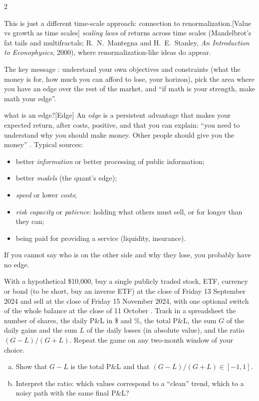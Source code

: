 \begin{paracol}{2}
\begin{answer}{This is just a different time-scale approach: connection to renormalization.}[Value vs growth as time scales]
\emph{scaling laws} of returns across time scales (Mandelbrot's fat tails and multifractals;
R.~N.~Mantegna and H.~E.~Stanley, \emph{An Introduction to Econophysics}, 2000), where
renormalization-like ideas do appear.
\end{answer}
The key message : understand your own objectives and constraints (what the
money is for, how much you can afford to lose, your horizon), pick the area where you have an edge
over the rest of the market, and ``if math is your strength, make math your edge''. \begin{answer}{what is an edge?}[Edge]
An \emph{edge} is a persistent advantage that makes your expected return, after costs, positive,
and that you can explain: ``you need to understand why you should make money. Other people
should give you the money'' . Typical sources:
\begin{itemize}
  \item better \emph{information} or better processing of public information;
  \item better \emph{models} (the quant's edge);
  \item \emph{speed} or lower \emph{costs};
  \item \emph{risk capacity} or \emph{patience}: holding what others must sell, or for longer than they can;
  \item being paid for providing a service (liquidity, insurance).
\end{itemize}
If you cannot say who is on the other side and why they lose, you probably have no edge.
\end{answer}


\begin{exercise}\label{ex:game}
With a hypothetical \$10{,}000, buy a single publicly traded stock, ETF, currency or bond (to be short,
buy an inverse ETF) at the close of Friday 13 September 2024 and sell at the close of Friday
15 November 2024, with one optional switch of the whole balance at the close of 11 October
. Track in a spreadsheet the number of shares, the daily P\&L in \$ and \%, the
total P\&L, the sum $G$ of the daily gains and the sum $L$ of the daily losses (in absolute value), and
the ratio $(G-L)/(G+L)$. Repeat the game on any two-month window of your choice.
\begin{enumerate}[(a)]
  \item Show that $G-L$ is the total P\&L and that $(G-L)/(G+L)\in[-1,1]$.
  \item Interpret the ratio: which values correspond to a ``clean'' trend, which to a noisy
        path with the same final P\&L?
\end{enumerate}
\end{exercise}


\end{paracol}
